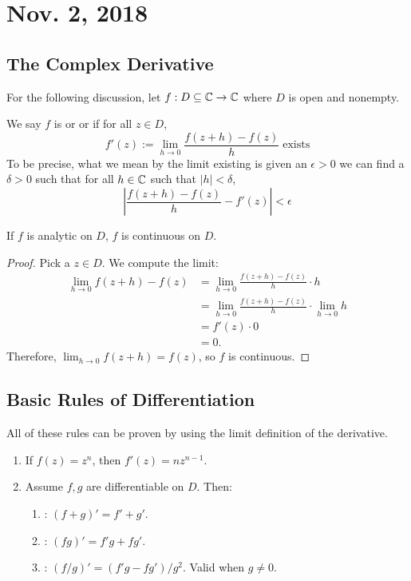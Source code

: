 \section{Nov. 2, 2018}
\subsection{The Complex Derivative}
For the following discussion, let $f: D \subseteq \operatorname{\mathbb{C}} \to \operatorname{\mathbb{C}}$ where $D$ is open and nonempty.

\begin{definition}
    We say $f$ is  or  or  if for all $z \in D$,
    \[ f'(z) := \lim_{h \to 0} \frac{f(z+h) - f(z)}{h} \; \text{exists} \]
    To be precise, what we mean by the limit existing is given an $\epsilon > 0$ 
    we can find a $\delta > 0$ such that for all $h \in \operatorname{\mathbb{C}}$ such that $|h| < \delta$,
    \[ \left| \frac{f(z+h) - f(z)}{h} - f'(z) \right| < \epsilon \] 

\end{definition}

\begin{theorem}
    If $f$ is analytic on $D$, $f$ is continuous on $D$.
\end{theorem}

\begin{proof}
    Pick a $z \in D$.
    We compute the limit:
    \begin{align*}
        \lim_{h \to 0} f(z+h) - f(z) &= \lim_{h\to 0} \frac{f(z+h)-f(z)}{h} \cdot h \\
        &= \lim_{h \to 0} \frac{f(z+h)-f(z)}{h} \cdot \lim_{h\to 0} h \\
        &= f'(z) \cdot 0 \\
        &= 0.
    \end{align*}
    Therefore, $\lim_{h \to 0} f(z+h) = f(z)$, so $f$ is continuous.
\end{proof}

\subsection{Basic Rules of Differentiation}
All of these rules can be proven by using the limit definition of the derivative.
\begin{enumerate}
    \item If $f(z) = z^n$, then $f'(z) = nz^{n-1}$.
    \item Assume $f,g$ are differentiable on $D$. Then:
    \begin{enumerate}
        \item {}: $(f + g)' = f' + g'$.
        \item {}: $(fg)' = f'g + fg'$.
        \item {}: $(f/g)' = (f'g - fg')/g^2$.  
        Valid when $g \ne 0$.
    \end{enumerate}
\end{enumerate}

